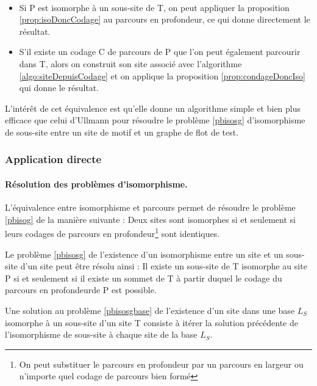 \begin{pr}
~
 \begin{itemize}
  \item Si P est isomorphe à un sous-site de T, on peut appliquer la proposition \ref{prop:isoDoncCodage} au parcours en profondeur, ce qui donne directement le résultat.
  \item S'il existe un codage C de parcours de P que l'on peut également parcourir dans T, alors on construit son site associé avec l'algorithme \ref{algo:siteDepuisCodage} et on applique la proposition \ref{prop:condageDoncIso} qui donne le résultat.
 \end{itemize}
\end{pr}

L'intérêt de cet équivalence est qu'elle donne un algorithme simple et bien plus efficace que celui d'Ullmann pour résoudre le problème \ref{pbisosg} d'isomorphisme de sous-site entre un site de motif et un graphe de flot de test.

\subsubsection{Application directe}
\paragraph{Résolution des problèmes d'isomorphisme.}
L'équivalence entre isomorphisme et parcours permet de résoudre le problème \ref{pbisog} de la manière suivante :
Deux sites sont isomorphes si et seulement si leurs codages de parcours en profondeur\footnote{On peut substituer le parcours en profondeur par un parcours en largeur ou n'importe quel codage de parcours bien formé} sont identiques.

Le problème \ref{pbisosg} de l'existence d'un isomorphisme entre un site et un sous-site d'un site peut être résolu ainsi :
Il existe un sous-site de T isomorphe au site P si et seulement si il existe un sommet de T à partir duquel le codage du parcours en profondeur\footnotemark[\value{footnote}] de P est possible.

Une solution au problème \ref{pbisosgbase} de l'existence d'un site dans une base $L_S$ isomorphe à un sous-site d'un site T consiste à itérer la solution précédente de l'isomorphisme de sous-site à chaque site de la base $L_S$.

